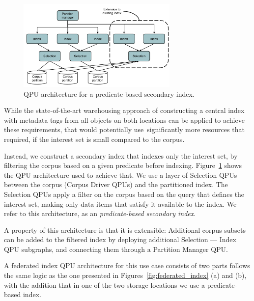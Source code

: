\begin{figure}
  \centering
    \includegraphics[width=0.7\textwidth]{./figures/case_studies/predicate_based_index.pdf}
  \caption{QPU architecture for a predicate-based secondary index.}
  \label{fig:predicate_based_index}
\end{figure}

\medskip
\noindent
While the state-of-the-art warehousing approach of constructing a central index with metadata tags from all objects
on both locations can be applied to achieve these requirements,
that would potentially use significantly more resources that required,
if the interest set is small compared to the corpus.

Instead, we construct a secondary index that indexes only the interest set,
by filtering the corpus based on a given predicate before indexing.
Figure~\ref{fig:predicate_based_index} shows the QPU architecture used to achieve that.
We use a layer of Selection QPUs between the corpus (Corpus Driver QPUs) and the partitioned index.
The Selection QPUs apply a filter on the corpus based on the query that defines the interest set,
making only data items that satisfy it available to the index.
We refer to this architecture, as an \textit{predicate-based secondary index}.

A property of this architecture is that it is extensible:
Additional corpus subsets can be added to the filtered index by deploying additional Selection --- Index QPU subgraphs,
and connecting them through a Partition Manager QPU.

A federated index QPU architecture for this use case consists of two parts
follows the same logic as the one presented in Figures~\ref{fig:federated_index} (a) and (b),
with the addition that in one of the two storage locations we use a predicate-based index.


